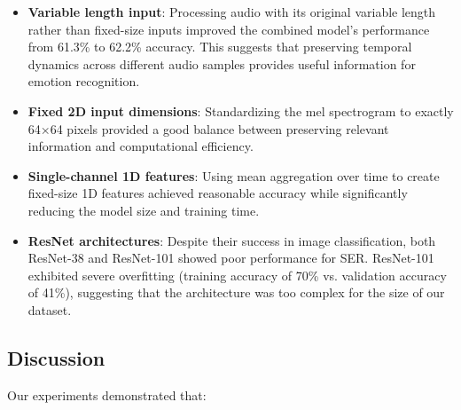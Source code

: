 \begin{itemize}
    \item \textbf{Variable length input}: Processing audio with its original variable length rather than fixed-size inputs improved the combined model's performance from 61.3\% to 62.2\% accuracy. This suggests that preserving temporal dynamics across different audio samples provides useful information for emotion recognition.
    
    \item \textbf{Fixed 2D input dimensions}: Standardizing the mel spectrogram to exactly 64×64 pixels provided a good balance between preserving relevant information and computational efficiency.
    
    \item \textbf{Single-channel 1D features}: Using mean aggregation over time to create fixed-size 1D features achieved reasonable accuracy while significantly reducing the model size and training time.
    
    \item \textbf{ResNet architectures}: Despite their success in image classification, both ResNet-38 and ResNet-101 showed poor performance for SER. ResNet-101 exhibited severe overfitting (training accuracy of 70\% vs. validation accuracy of 41\%), suggesting that the architecture was too complex for the size of our dataset.
\end{itemize}

\subsection{Discussion}

Our experiments demonstrated that:

